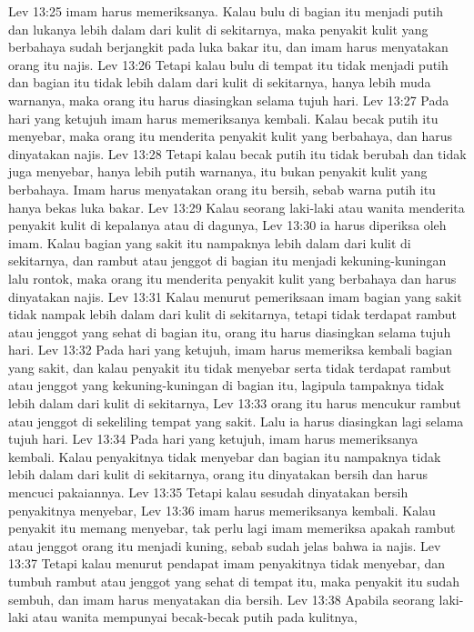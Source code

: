 Lev 13:25  imam harus memeriksanya. Kalau bulu di bagian itu menjadi putih dan lukanya lebih dalam dari kulit di sekitarnya, maka penyakit kulit yang berbahaya sudah berjangkit pada luka bakar itu, dan imam harus menyatakan orang itu najis.
Lev 13:26  Tetapi kalau bulu di tempat itu tidak menjadi putih dan bagian itu tidak lebih dalam dari kulit di sekitarnya, hanya lebih muda warnanya, maka orang itu harus diasingkan selama tujuh hari.
Lev 13:27  Pada hari yang ketujuh imam harus memeriksanya kembali. Kalau becak putih itu menyebar, maka orang itu menderita penyakit kulit yang berbahaya, dan harus dinyatakan najis.
Lev 13:28  Tetapi kalau becak putih itu tidak berubah dan tidak juga menyebar, hanya lebih putih warnanya, itu bukan penyakit kulit yang berbahaya. Imam harus menyatakan orang itu bersih, sebab warna putih itu hanya bekas luka bakar.
Lev 13:29  Kalau seorang laki-laki atau wanita menderita penyakit kulit di kepalanya atau di dagunya,
Lev 13:30  ia harus diperiksa oleh imam. Kalau bagian yang sakit itu nampaknya lebih dalam dari kulit di sekitarnya, dan rambut atau jenggot di bagian itu menjadi kekuning-kuningan lalu rontok, maka orang itu menderita penyakit kulit yang berbahaya dan harus dinyatakan najis.
Lev 13:31  Kalau menurut pemeriksaan imam bagian yang sakit tidak nampak lebih dalam dari kulit di sekitarnya, tetapi tidak terdapat rambut atau jenggot yang sehat di bagian itu, orang itu harus diasingkan selama tujuh hari.
Lev 13:32  Pada hari yang ketujuh, imam harus memeriksa kembali bagian yang sakit, dan kalau penyakit itu tidak menyebar serta tidak terdapat rambut atau jenggot yang kekuning-kuningan di bagian itu, lagipula tampaknya tidak lebih dalam dari kulit di sekitarnya,
Lev 13:33  orang itu harus mencukur rambut atau jenggot di sekeliling tempat yang sakit. Lalu ia harus diasingkan lagi selama tujuh hari.
Lev 13:34  Pada hari yang ketujuh, imam harus memeriksanya kembali. Kalau penyakitnya tidak menyebar dan bagian itu nampaknya tidak lebih dalam dari kulit di sekitarnya, orang itu dinyatakan bersih dan harus mencuci pakaiannya.
Lev 13:35  Tetapi kalau sesudah dinyatakan bersih penyakitnya menyebar,
Lev 13:36  imam harus memeriksanya kembali. Kalau penyakit itu memang menyebar, tak perlu lagi imam memeriksa apakah rambut atau jenggot orang itu menjadi kuning, sebab sudah jelas bahwa ia najis.
Lev 13:37  Tetapi kalau menurut pendapat imam penyakitnya tidak menyebar, dan tumbuh rambut atau jenggot yang sehat di tempat itu, maka penyakit itu sudah sembuh, dan imam harus menyatakan dia bersih.
Lev 13:38  Apabila seorang laki-laki atau wanita mempunyai becak-becak putih pada kulitnya,
